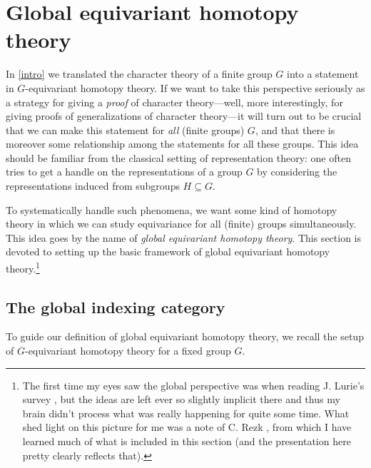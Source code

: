 \section{Global equivariant homotopy theory}
\label{global}

In \cref{intro} we translated the character theory of a finite group
$G$ into a statement in $G$-equivariant homotopy theory. If we want to
take this perspective seriously as a strategy for giving a
\emph{proof} of character theory---well, more interestingly, for
giving proofs of generalizations of character theory---it will turn
out to be crucial that we can make this statement for \emph{all}
(finite groups) $G$, and that there is moreover some relationship
among the statements for all these groups. This idea should be
familiar from the classical setting of representation theory: one
often tries to get a handle on the representations of a group $G$ by
considering the representations induced from subgroups
$H \subseteq G$.

To systematically handle such phenomena, we want some kind of homotopy
theory in which we can study equivariance for all (finite) groups
simultaneously. This idea goes by the name of \emph{global equivariant
  homotopy theory}. This section is devoted to setting up the basic
framework of global equivariant homotopy theory.\footnote{The first
  time my eyes saw the global perspective was when reading J. Lurie's
  survey \cite{lurie-elliptic-survey}, but the ideas are left ever so
  slightly implicit there and thus my brain didn't process what was
  really happening for quite some time. What shed light on this
  picture for me was a note of C. Rezk \cite{rezk-global-cohesion},
  from which I have learned much of what is included in this section
  (and the presentation here pretty clearly reflects that).}


\subsection{The global indexing category}
\label{global-indexcat}

To guide our definition of global equivariant homotopy theory, we
recall the setup of $G$-equivariant homotopy theory for a fixed group
$G$.

